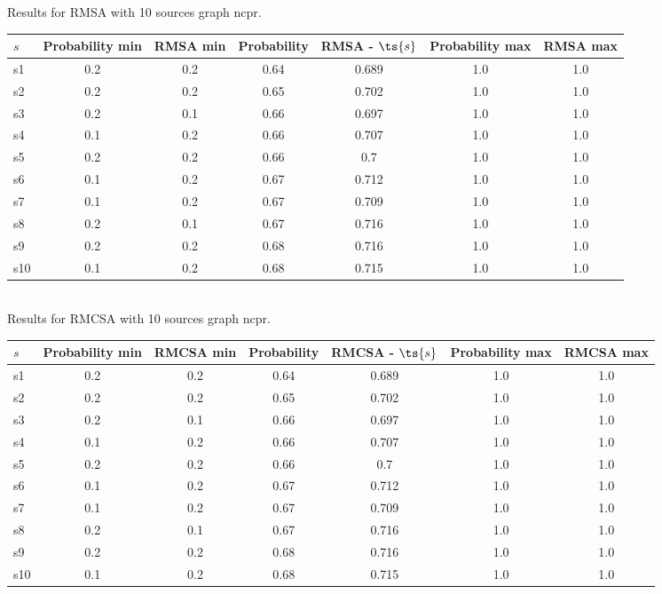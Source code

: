 \documentclass{article}
\begin{document}
\noindent Results for RMSA with 10 sources graph ncpr.

\noindent\begin{tabular}{|l|c|c|c|c|c|c|}
\hline
$s$& Probability min & RMSA min & Probability & RMSA - $\ts{s}$ & Probability max & RMSA max\\
\hline
s1 &0.2 & 0.2 & 0.64 & 0.689 & 1.0 & 1.0\\
\hline
s2 &0.2 & 0.2 & 0.65 & 0.702 & 1.0 & 1.0\\
\hline
s3 &0.2 & 0.1 & 0.66 & 0.697 & 1.0 & 1.0\\
\hline
s4 &0.1 & 0.2 & 0.66 & 0.707 & 1.0 & 1.0\\
\hline
s5 &0.2 & 0.2 & 0.66 & 0.7 & 1.0 & 1.0\\
\hline
s6 &0.1 & 0.2 & 0.67 & 0.712 & 1.0 & 1.0\\
\hline
s7 &0.1 & 0.2 & 0.67 & 0.709 & 1.0 & 1.0\\
\hline
s8 &0.2 & 0.1 & 0.67 & 0.716 & 1.0 & 1.0\\
\hline
s9 &0.2 & 0.2 & 0.68 & 0.716 & 1.0 & 1.0\\
\hline
s10 &0.1 & 0.2 & 0.68 & 0.715 & 1.0 & 1.0\\
\hline
\end{tabular}\\

\noindent Results for RMCSA with 10 sources graph ncpr.

\noindent\begin{tabular}{|l|c|c|c|c|c|c|}
\hline
$s$& Probability min & RMCSA min & Probability & RMCSA - $\ts{s}$ & Probability max & RMCSA max\\
\hline
s1 &0.2 & 0.2 & 0.64 & 0.689 & 1.0 & 1.0\\
\hline
s2 &0.2 & 0.2 & 0.65 & 0.702 & 1.0 & 1.0\\
\hline
s3 &0.2 & 0.1 & 0.66 & 0.697 & 1.0 & 1.0\\
\hline
s4 &0.1 & 0.2 & 0.66 & 0.707 & 1.0 & 1.0\\
\hline
s5 &0.2 & 0.2 & 0.66 & 0.7 & 1.0 & 1.0\\
\hline
s6 &0.1 & 0.2 & 0.67 & 0.712 & 1.0 & 1.0\\
\hline
s7 &0.1 & 0.2 & 0.67 & 0.709 & 1.0 & 1.0\\
\hline
s8 &0.2 & 0.1 & 0.67 & 0.716 & 1.0 & 1.0\\
\hline
s9 &0.2 & 0.2 & 0.68 & 0.716 & 1.0 & 1.0\\
\hline
s10 &0.1 & 0.2 & 0.68 & 0.715 & 1.0 & 1.0\\
\hline
\end{tabular}\\
\end{document}

